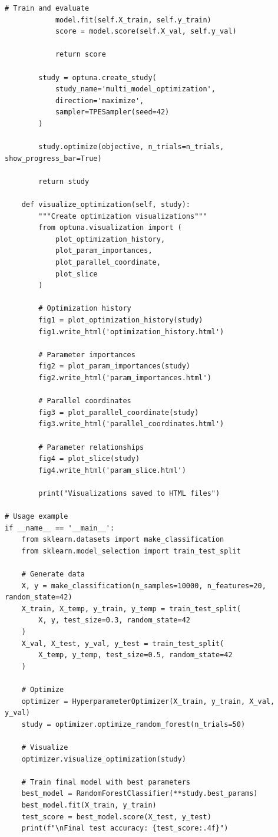 \begin{lstlisting}[style=python, caption=Advanced hyperparameter optimization with Optuna]
            # Train and evaluate
            model.fit(self.X_train, self.y_train)
            score = model.score(self.X_val, self.y_val)

            return score

        study = optuna.create_study(
            study_name='multi_model_optimization',
            direction='maximize',
            sampler=TPESampler(seed=42)
        )

        study.optimize(objective, n_trials=n_trials, show_progress_bar=True)

        return study

    def visualize_optimization(self, study):
        """Create optimization visualizations"""
        from optuna.visualization import (
            plot_optimization_history,
            plot_param_importances,
            plot_parallel_coordinate,
            plot_slice
        )

        # Optimization history
        fig1 = plot_optimization_history(study)
        fig1.write_html('optimization_history.html')

        # Parameter importances
        fig2 = plot_param_importances(study)
        fig2.write_html('param_importances.html')

        # Parallel coordinates
        fig3 = plot_parallel_coordinate(study)
        fig3.write_html('parallel_coordinates.html')

        # Parameter relationships
        fig4 = plot_slice(study)
        fig4.write_html('param_slice.html')

        print("Visualizations saved to HTML files")

# Usage example
if __name__ == '__main__':
    from sklearn.datasets import make_classification
    from sklearn.model_selection import train_test_split

    # Generate data
    X, y = make_classification(n_samples=10000, n_features=20, random_state=42)
    X_train, X_temp, y_train, y_temp = train_test_split(
        X, y, test_size=0.3, random_state=42
    )
    X_val, X_test, y_val, y_test = train_test_split(
        X_temp, y_temp, test_size=0.5, random_state=42
    )

    # Optimize
    optimizer = HyperparameterOptimizer(X_train, y_train, X_val, y_val)
    study = optimizer.optimize_random_forest(n_trials=50)

    # Visualize
    optimizer.visualize_optimization(study)

    # Train final model with best parameters
    best_model = RandomForestClassifier(**study.best_params)
    best_model.fit(X_train, y_train)
    test_score = best_model.score(X_test, y_test)
    print(f"\nFinal test accuracy: {test_score:.4f}")
\end{lstlisting}


